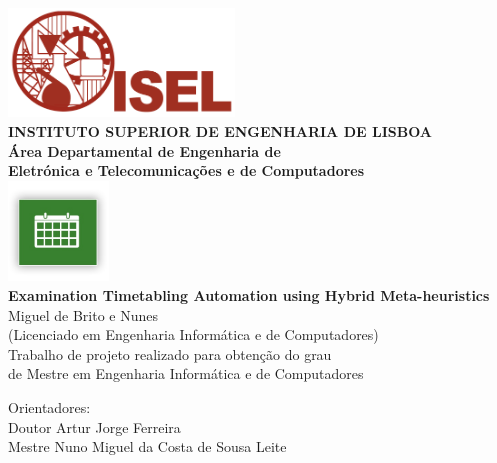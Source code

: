 \begin{titlepage}
	\begin{center}
		\includegraphics[width=0.45\textwidth,natwidth=720,natheight=434]{./images/isellogo2.png} \\[0.5cm]
		{\Large \textbf{INSTITUTO SUPERIOR DE ENGENHARIA DE LISBOA}} \\[0.5cm]
		{\Large \textbf{Área Departamental de Engenharia de \\Eletrónica e Telecomunica\c cões e de Computadores}} \\[0.8cm]		
		\includegraphics[width=0.2\textwidth,natwidth=300,natheight=300]{./images/timetable.jpg} \\[0.8cm]
		\fontsize{18pt}{10pt}\selectfont
		{\textbf{Examination Timetabling Automation using Hybrid Meta-heuristics}} \\[0.8cm]
		\fontsize{16pt}{10pt}\selectfont
		Miguel de Brito e Nunes\\[0.2cm]
		\fontsize{14pt}{10pt}\selectfont
		(Licenciado em Engenharia Informática e de Computadores)\\[0.8cm]
		\fontsize{12pt}{10pt}\selectfont
		{Trabalho de projeto realizado para obten\c cão do grau\\de Mestre em Engenharia Informática e de Computadores} \\[0.8cm]
		\begin{tabbing}
		   \fontsize{12pt}{10pt}\selectfont
		   Orientadores: \\
		   \fontsize{11pt}{10pt}\selectfont
		   \hspace{1.1cm}Doutor Artur Jorge Ferreira \\
		   \fontsize{11pt}{10pt}\selectfont
		   \hspace{1.1cm}Mestre Nuno Miguel da Costa de Sousa Leite \\
		\end{tabbing}

\end{center}
\end{titlepage}
